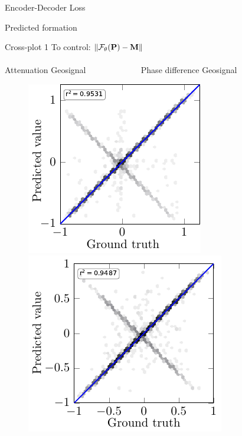 \begin{frame}{Encoder-Decoder Loss}
\begin{center}
{\large Predicted formation}
\end{center}
\begin{figure}
		\centering
		
	\label{fig:formation_model_1_original}
\end{figure}
\end{frame}


\begin{frame}{Cross-plot 1}
\centering
\setlength{\fboxrule}{0.5mm}
\setlength{\fboxsep}{1mm}
\color{red}
\color{black}
To control: $\|{\cal F}_{\theta}({\bf P})-{\bf M} \|$ \hspace{1cm}   \\
$\qquad$ \\
\hspace{0.8cm} Attenuation Geosignal $\qquad \qquad \qquad$ Phase difference Geosignal
\begin{figure}[!h]
\centering
	{\includegraphics[scale=0.9]{Diapos/DL_For_Inv/Figures/Syn_example/Cross_plots/C_P_1/Atten-Geosignal_axis.pdf}%
		\hspace{2cm}
	\includegraphics[trim=0cm 0cm 0.3cm 0.25cm ,scale=0.9]{Diapos/DL_For_Inv/Figures/Syn_example/Cross_plots/C_P_1/Phase-Geosignal_axis.pdf}}	

\end{figure}
\end{frame}
